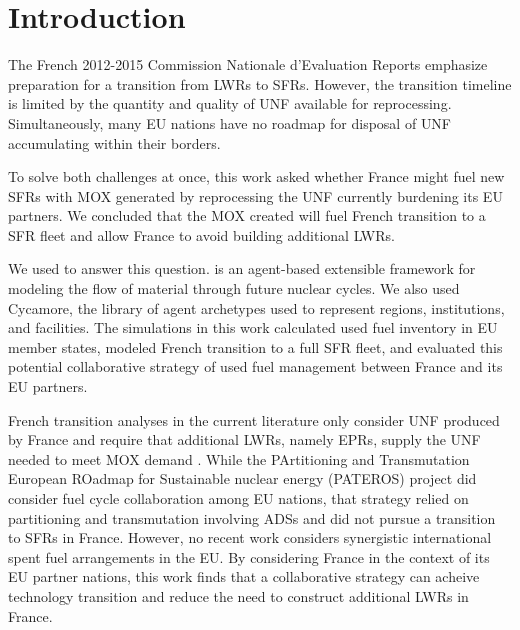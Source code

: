 
\section{Introduction}
The French 2012-2015 Commission Nationale d'Evaluation Reports
\cite{cne2_reports_2015} emphasize preparation for a transition from \glspl{LWR} to \glspl{SFR}.
However, the transition timeline is limited by the quantity and quality 
of \gls{UNF} available for reprocessing. Simultaneously, many \gls{EU} nations 
have no roadmap for disposal of \gls{UNF} accumulating within their borders.

To solve both challenges at once, this work asked whether France might fuel new 
\glspl{SFR} with \gls{MOX} generated by reprocessing the \gls{UNF} currently 
burdening its \gls{EU} partners. We concluded that the \gls{MOX} created will 
fuel French transition to a \gls{SFR} fleet and allow France to avoid building 
additional \glspl{LWR}.

We used \Cyclus \cite{huff_fundamental_2016} to answer this question. 
\Cyclus is an agent-based extensible framework for modeling the flow of 
material through future nuclear cycles. We also used Cycamore, the library of 
\Cyclus agent archetypes used to represent regions, institutions, and facilities. The simulations 
in this work calculated used fuel inventory in \gls{EU} member states, modeled French 
transition to a full \gls{SFR} fleet, and evaluated this potential collaborative
strategy of used fuel management between France and its \gls{EU} partners.

French transition analyses in the current literature only consider \gls{UNF}
produced by France and require that additional \glspl{LWR}, namely \glspl{EPR},
supply the \gls{UNF} needed to meet \gls{MOX} demand \cite{carre_overview_2009,
martin_symbiotic_2017, freynet_multiobjective_2016}.  While the PArtitioning
and  Transmutation  European ROadmap  for  Sustainable nuclear  energy
(PATEROS) project \cite{fazio_study_2013, 
martinez-val_pateros_2009,merino_rodriguez_analysis_2014} did consider fuel cycle collaboration
among \gls{EU} nations, that strategy relied on partitioning and transmutation
involving \glspl{ADS} and did not pursue a transition to \glspl{SFR} in France.  However, no recent work considers synergistic
international spent fuel arrangements in the \gls{EU}.  By considering France
in the context of its \gls{EU} partner nations, this work finds that a
collaborative strategy can acheive technology transition and reduce the need to
construct additional \glspl{LWR} in France.
